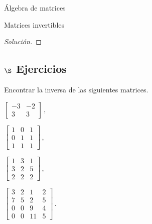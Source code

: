 \begin{chapter}{\'Algebra de matrices}
\begin{section}{Matrices invertibles}
\begin{proof}[Solución]
            \end{proof}
            
            \subsection*{$\S$ Ejercicios}

            \begin{enumex}
                \item Encontrar la inversa de las siguientes matrices.
                    \begin{enumex}
                        \begin{minipage}{0.4\textwidth}
                        \item $\begin{bmatrix}
                            -3&-2\\3&3
                        \end{bmatrix}$\,,
                    \end{minipage}
                    \begin{minipage}{0.4\textwidth}
                        \item $\begin{bmatrix}
                            1&0&1\\ 0&1&1\\ 1&1&1
                        \end{bmatrix}$\,,
                    \end{minipage}

                    \begin{minipage}{0.4\textwidth}
                        \item $\begin{bmatrix}
                            1&3&1 \\ 3&2&5\\ 2&2&2
                        \end{bmatrix}$\,,
                    \end{minipage}
                    \begin{minipage}{0.4\textwidth}
                        \item $\begin{bmatrix}
                            3&2&1&2\\ 7&5&2&5\\ 0&0&9&4\\ 0&0&11&5
                        \end{bmatrix}$\,. 
                    \end{minipage}
                    \end{enumex}


\end{enumex}
\end{section}
\end{chapter}
